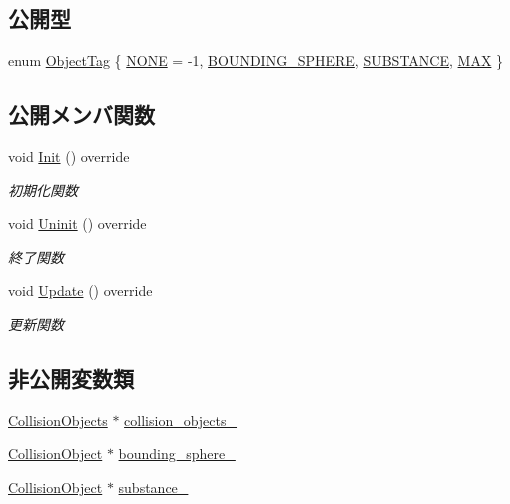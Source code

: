 \subsection*{公開型}
\begin{DoxyCompactItemize}
\item 
enum \mbox{\hyperlink{class_enemy_collision_a8423c2c1dce9ba8ab2ba9bed82ee4843}{Object\+Tag}} \{ \mbox{\hyperlink{class_enemy_collision_a8423c2c1dce9ba8ab2ba9bed82ee4843a54855bb90bae23d3697d74e0b20462a2}{N\+O\+NE}} = -\/1, 
\mbox{\hyperlink{class_enemy_collision_a8423c2c1dce9ba8ab2ba9bed82ee4843a327f14f5b5cd28a3e605ff4f7066e8ce}{B\+O\+U\+N\+D\+I\+N\+G\+\_\+\+S\+P\+H\+E\+RE}}, 
\mbox{\hyperlink{class_enemy_collision_a8423c2c1dce9ba8ab2ba9bed82ee4843a8c9cd2ea0a1628d412fc501c91541ab0}{S\+U\+B\+S\+T\+A\+N\+CE}}, 
\mbox{\hyperlink{class_enemy_collision_a8423c2c1dce9ba8ab2ba9bed82ee4843a4283c301ae1d9317453c36d5923f7136}{M\+AX}}
 \}
\end{DoxyCompactItemize}
\subsection*{公開メンバ関数}
\begin{DoxyCompactItemize}
\item 
void \mbox{\hyperlink{class_enemy_collision_ae5c000a30c8c4a023dd0c8e658def772}{Init}} () override
\begin{DoxyCompactList}\small\item\em 初期化関数 \end{DoxyCompactList}\item 
void \mbox{\hyperlink{class_enemy_collision_a2a194c606fd162db803c70c6fed9b9e4}{Uninit}} () override
\begin{DoxyCompactList}\small\item\em 終了関数 \end{DoxyCompactList}\item 
void \mbox{\hyperlink{class_enemy_collision_ab54133504d867c6d2070d2f3854a0aaf}{Update}} () override
\begin{DoxyCompactList}\small\item\em 更新関数 \end{DoxyCompactList}\end{DoxyCompactItemize}
\subsection*{非公開変数類}
\begin{DoxyCompactItemize}
\item 
\mbox{\hyperlink{class_collision_objects}{Collision\+Objects}} $\ast$ \mbox{\hyperlink{class_enemy_collision_a8d3eac14a182985164d52a8fb385bd78}{collision\+\_\+objects\+\_\+}}
\item 
\mbox{\hyperlink{class_collision_object}{Collision\+Object}} $\ast$ \mbox{\hyperlink{class_enemy_collision_a065309bed90f1b2e3539cb9859bc06ef}{bounding\+\_\+sphere\+\_\+}}
\item 
\mbox{\hyperlink{class_collision_object}{Collision\+Object}} $\ast$ \mbox{\hyperlink{class_enemy_collision_aa772f240ff6bb9d9cb4c6c2095b79b32}{substance\+\_\+}}
\end{DoxyCompactItemize}
